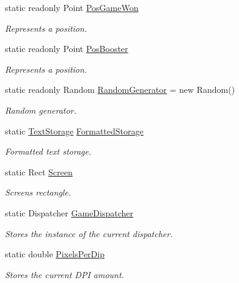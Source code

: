 \begin{DoxyCompactItemize}
static readonly Point \mbox{\hyperlink{class_o_e_invaders_1_1_logic_1_1_game_logic_abfbdc45a3ffc61f7ee6bb89517ed6eca}{Pos\+Game\+Won}}
\begin{DoxyCompactList}\small\item\em Represents a position. \end{DoxyCompactList}\item 
static readonly Point \mbox{\hyperlink{class_o_e_invaders_1_1_logic_1_1_game_logic_a02f5c59eece5dd043eaaa4ccdc27dbde}{Pos\+Booster}}
\begin{DoxyCompactList}\small\item\em Represents a position. \end{DoxyCompactList}\item 
static readonly Random \mbox{\hyperlink{class_o_e_invaders_1_1_logic_1_1_game_logic_afb4dea52c559639ed872ddc72faafb2e}{Random\+Generator}} = new Random()
\begin{DoxyCompactList}\small\item\em Random generator. \end{DoxyCompactList}\item 
static \mbox{\hyperlink{class_o_e_invaders_1_1_library_1_1_text_storage}{Text\+Storage}} \mbox{\hyperlink{class_o_e_invaders_1_1_logic_1_1_game_logic_a649bf51cd8f5f517593fb0345281f7c9}{Formatted\+Storage}}
\begin{DoxyCompactList}\small\item\em Formatted text storage. \end{DoxyCompactList}\item 
static Rect \mbox{\hyperlink{class_o_e_invaders_1_1_logic_1_1_game_logic_a04dc7cee462b5fa707969abe0d5bf137}{Screen}}
\begin{DoxyCompactList}\small\item\em Screen\textquotesingle{}s rectangle. \end{DoxyCompactList}\item 
static Dispatcher \mbox{\hyperlink{class_o_e_invaders_1_1_logic_1_1_game_logic_a2601f892e14c04e58b31c62c6634c35e}{Game\+Dispatcher}}
\begin{DoxyCompactList}\small\item\em Stores the instance of the current dispatcher. \end{DoxyCompactList}\item 
static double \mbox{\hyperlink{class_o_e_invaders_1_1_logic_1_1_game_logic_a19e8500445e2e0d57efefd120452df7f}{Pixels\+Per\+Dip}}
\begin{DoxyCompactList}\small\item\em Stores the current D\+PI amount. \end{DoxyCompactList}\end{DoxyCompactItemize}
